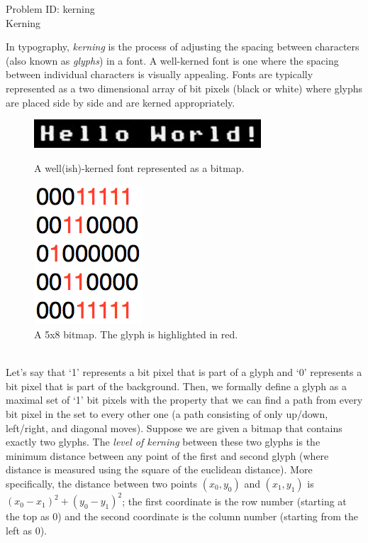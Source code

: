\documentclass[a4paper,11pt]{article}
\begin{document}
\begin{center}
{\Huge Problem ID: kerning}\vspace{2 mm} \\	%
{\huge Kerning}\vspace{2 mm} \\	%
\end{center}
\setcounter{page}{9}
\large{
In typography, \emph{kerning} is the process of adjusting the spacing between characters (also known as \emph{glyphs}) in a font. A well-kerned font is one where the spacing between individual characters is visually appealing. Fonts are typically represented as a two dimensional array of bit pixels (black or white) where glyphs are placed side by side and are kerned appropriately.\\
\begin{figure}[!htb]
    \centering
    \begin{minipage}{.5\textwidth}
        \centering
        \includegraphics[width=0.5\linewidth, height=0.05\textheight]{hw.jpg}
        \caption{A well(ish)-kerned font represented as a bitmap.}
    \end{minipage}%
    \begin{minipage}{0.5\textwidth}
        \centering
        \includegraphics[width=0.32\linewidth, height=0.143\textheight]{bitmap.png}
        \caption{A 5x8 bitmap. The glyph is highlighted in red.}
    \end{minipage}
\end{figure}
\\
Let's say that `1' represents a bit pixel that is part of a glyph and `0' represents a bit pixel that is part of the background. Then, we formally define a glyph as a maximal set of `1' bit pixels with the property that we can find a path from every bit pixel in the set to every other one (a path consisting of only up/down, left/right, and diagonal moves). Suppose we are given a bitmap that contains exactly two glyphs. The \emph{level of kerning} between these two glyphs is the minimum distance between any point of the first and second glyph (where distance is measured using the square of the euclidean distance). More specifically, the distance between two points $(x_0, y_0)$ and $(x_1, y_1)$ is $(x_0-x_1)^2 + (y_0-y_1)^2$; the first coordinate is the row number (starting at the top as 0) and the second coordinate is the column number (starting from the left as 0).
}
\end{document}
